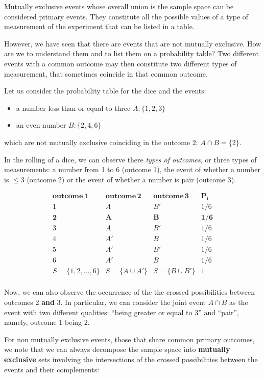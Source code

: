 \documentclass[
]{book}
\begin{document}
Mutually exclusive events whose overall union is the sample space can be considered primary events. They constitute all the possible values of a type of measurement of the experiment that can be listed in a table.

However, we have seen that there are events that are not mutually exclusive. How are we to understand them and to list them on a probability table? Two different events with a common outcome may then constitute two different types of measurement, that sometimes coincide in that common outcome.

Let us consider the probability table for the dice and the events:

\begin{itemize}
\item
  a number less than or equal to three \(A:\{ 1,2,3\}\)
\item
  an even number \(B:\{ 2,4,6\}\)
\end{itemize}

which are not mutually exclusive coinciding in the outcome \(2\): \(A \cap B = \{2\}\).

In the rolling of a dice, we can observe there \emph{types of outcomes}, or three types of measurements: a number from 1 to 6 (outcome 1), the event of whether a number is \(\leq 3\) (outcome 2) or the event of whether a number is pair (outcome 3).

\[
\begin{array}{cccc}
\mathbf{outcome\, 1} & \mathbf{outcome\, 2} & \mathbf{outcome\, 3}  & \mathbf{P_i} \\
1 & A & B' & 1/6 \\
\mathbf{2} & \mathbf{A} & \mathbf{B} & \mathbf{1/6} \\
3 & A & B' & 1/6 \\
4 & A'& B & 1/6 \\
5 & A'& B' & 1/6 \\
6 & A'& B & 1/6 \\ \hline
S=\{1, 2, ... ,6\} & S=\{A \cup A'\} & S=\{B \cup B'\} & 1 \\ 
\end{array}
\]

Now, we can also observe the occurrence of the the crossed possibilities between outcomes 2 \textbf{and} 3. In particular, we can consider the joint event \(A\cap B\) as the event with two different qualities: ``being greater or equal to 3'' and ``pair'', namely, outcome 1 being \(2\).

For non mutually exclusive events, those that share common primary outcomes, we note that we can always decompose the sample space into \textbf{mutually exclusive} sets involving the intersections of the crossed possibilities between the events and their complements:
\end{document}
